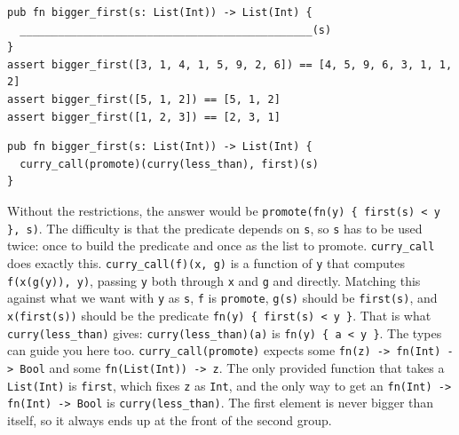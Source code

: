 \begin{parts}
\begin{blocksection}
\begin{lstlisting}
pub fn bigger_first(s: List(Int)) -> List(Int) {
  ______________________________________________(s)
}
assert bigger_first([3, 1, 4, 1, 5, 9, 2, 6]) == [4, 5, 9, 6, 3, 1, 1, 2]
assert bigger_first([5, 1, 2]) == [5, 1, 2]
assert bigger_first([1, 2, 3]) == [2, 3, 1]
\end{lstlisting}
\begin{solution}
\begin{lstlisting}
pub fn bigger_first(s: List(Int)) -> List(Int) {
  curry_call(promote)(curry(less_than), first)(s)
}
\end{lstlisting}
\end{solution}
\begin{questionmeta}
  Without the restrictions, the answer would be \lstinline|promote(fn(y) { first(s) < y }, s)|. The difficulty is that the predicate depends on \texttt{s}, so \texttt{s} has to be used twice: once to build the predicate and once as the list to promote. \texttt{curry\_call} does exactly this. \lstinline{curry_call(f)(x, g)} is a function of \texttt{y} that computes \lstinline{f(x(g(y)), y)}, passing \texttt{y} both through \texttt{x} and \texttt{g} and directly.
  Matching this against what we want with \texttt{y} as \texttt{s}, \texttt{f} is \texttt{promote}, \lstinline{g(s)} should be \lstinline{first(s)}, and \lstinline{x(first(s))} should be the predicate \lstinline|fn(y) { first(s) < y }|. That is what \lstinline{curry(less_than)} gives: \lstinline{curry(less_than)(a)} is \lstinline|fn(y) { a < y }|.
  The types can guide you here too. \lstinline{curry_call(promote)} expects some \lstinline{fn(z) -> fn(Int) -> Bool} and some \lstinline{fn(List(Int)) -> z}. The only provided function that takes a \lstinline{List(Int)} is \texttt{first}, which fixes \texttt{z} as \lstinline{Int}, and the only way to get an \lstinline{fn(Int) -> fn(Int) -> Bool} is \lstinline{curry(less_than)}.
  The first element is never bigger than itself, so it always ends up at the front of the second group.
\end{questionmeta}
\end{blocksection}
 
\end{parts}
